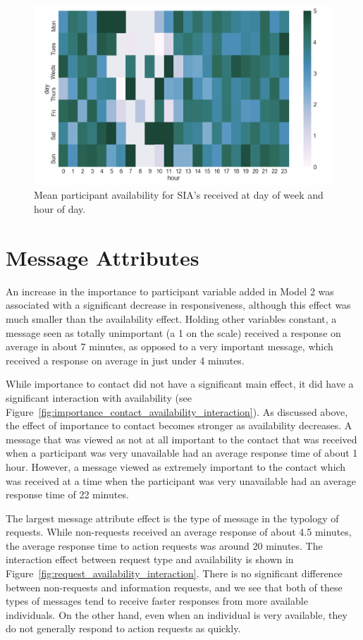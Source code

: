\documentclass[12pt]{nuthesis}	%
\begin{document}
\begin{figure}[h]
\centering
\includegraphics[width=.7\textwidth]{figures/sia_availability_heatmap}
\caption{Mean participant availability for SIA's received at day of week and hour of day.}
\label{fig:sia_availability_heatmap}
\end{figure}


\section{Message Attributes}

An increase in the importance to participant variable added in Model 2 was associated with a significant decrease in responsiveness, although this effect was much smaller than the availability effect. Holding other variables constant, a message seen as totally unimportant (a 1 on the scale) received a response on average in about 7 minutes, as opposed to a very important message, which received a response on average in just under 4 minutes.

While importance to contact did not have a significant main effect, it did have a significant interaction with availability (see Figure~\ref{fig:importance_contact_availability_interaction}). As discussed above, the effect of importance to contact becomes stronger as availability decreases. A message that was viewed as not at all important to the contact that was received when a participant was very unavailable had an average response time of about 1 hour. However, a message viewed as extremely important to the contact which was received at a time when the participant was very unavailable had an average response time of 22 minutes.

The largest message attribute effect is the type of message in the typology of requests. While non-requests received an average response of about 4.5 minutes, the average response time to action requests was around 20 minutes.  The interaction effect between request type and availability is shown in Figure~\ref{fig:request_availability_interaction}. There is no significant difference between non-requests and information requests, and we see that both of these types of messages tend to receive faster responses from more available individuals. On the other hand, even when an individual is very available, they do not generally respond to action requests as quickly.
\end{document}
